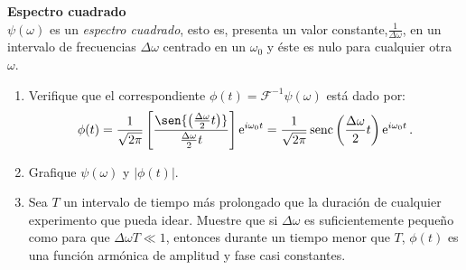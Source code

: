 
\item
\textbf{Espectro cuadrado}\\ 
\(\psi(\omega)\) es un \emph{espectro cuadrado}, esto es, presenta un valor constante,$\frac{1}{\Delta \omega}$, en un intervalo de frecuencias $\Delta\omega$ centrado en un $\omega_0$ y éste es nulo para cualquier otra $\omega$.
\begin{enumerate}
	\item
	Verifique que el correspondiente $\phi(t) = \mathcal{F}^{-1} \psi(\omega)$ está dado por:
	$$
		\phi(t)
		= \frac{1}{\sqrt{2 \pi}} \left[ \frac{ \sen{ \left( \frac{\Delta \omega}{2} t \right) } }{\frac{\Delta \omega}{2} t} \right] \operatorname{e}^{i \omega_0 t}
		= \frac{1}{\sqrt{2 \pi}} \operatorname{senc} \left( \frac{\Delta \omega}{2} t \right) \operatorname{e}^{i \omega_0 t}.
	$$
	\item
	Grafique $\psi(\omega)$ y $\left|\phi(t)\right|$.
	\item 
	Sea $T$ un intervalo de tiempo más prolongado que la duración de cualquier experimento que pueda idear.
	Muestre que si $\Delta\omega$ es suficientemente pequeño como para que $\Delta\omega T\ll1$, entonces durante un tiempo menor que $T$, $\phi(t)$ es una función armónica de amplitud y fase casi constantes.
\end{enumerate}



